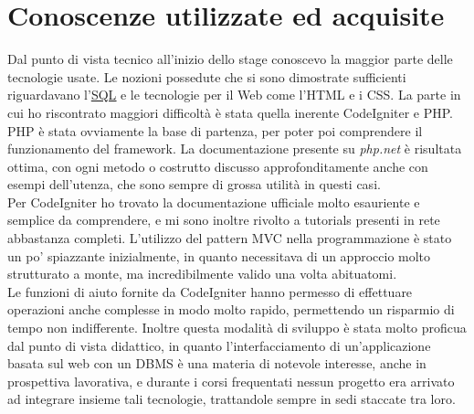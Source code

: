 \section{Conoscenze utilizzate ed acquisite}
Dal punto di vista tecnico all'inizio dello stage conoscevo la maggior parte delle tecnologie usate. Le nozioni possedute che si sono dimostrate sufficienti riguardavano l'\hyperlink{sql}{\underline{SQL}} e  le tecnologie per il Web come l'HTML e i CSS. La parte in cui ho riscontrato maggiori difficolt\`a \`e stata quella inerente CodeIgniter e PHP. 
PHP \`e stata ovviamente la base di partenza, per poter poi comprendere il funzionamento del framework. La documentazione presente su \textit{php.net} \cite{quattro} \`e risultata ottima, con ogni metodo o costrutto discusso approfonditamente anche con esempi dell'utenza, che sono sempre di grossa utilit\`a in questi casi. \\
Per CodeIgniter ho trovato la documentazione ufficiale molto esauriente e semplice da comprendere, e mi sono inoltre rivolto a tutorials presenti in rete abbastanza completi. L'utilizzo del pattern MVC nella programmazione \`e stato un po' spiazzante inizialmente, in quanto necessitava di un approccio molto strutturato a monte, ma incredibilmente valido una volta abituatomi. \\
Le funzioni di aiuto fornite da CodeIgniter hanno permesso di effettuare operazioni anche complesse in modo molto rapido, permettendo un risparmio di tempo non indifferente. Inoltre questa modalit\`a di sviluppo \`e stata molto proficua dal punto di vista didattico, in quanto l'interfacciamento di un'applicazione basata sul web con un DBMS \`e una materia di notevole interesse, anche in prospettiva lavorativa, e durante i corsi frequentati nessun progetto era arrivato ad integrare insieme tali tecnologie, trattandole sempre in sedi staccate tra loro. 

